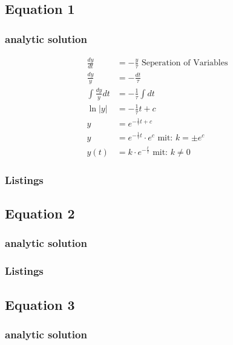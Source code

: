 \subsection{Equation 1}
\subsubsection{analytic solution}
\begin{align}
    \frac{dy}{dt}&=-\frac{y}{\tau} \text{  Seperation of Variables}\\
    \frac{dy}{y}&=-\frac{dt}{\tau} \\
    \int\frac{dy}{y} dt&=-\frac{1}{\tau} \int dt \\
    \ln{|y|}&=-\frac{1}{\tau}t+c \\
    y&=e^{-\frac{1}{\tau}t+c} \\
    y&=e^{-\frac{1}{\tau}t}\cdot e^{c} \text{ mit: } k=\pm e^c\\
    y(t)&=k\cdot e^{-\frac{t}{\tau}}\text{ mit: } k\neq0
\end{align}

\subsubsection{Listings}


\subsection{Equation 2}
\subsubsection{analytic solution}

\subsubsection{Listings}


\subsection{Equation 3}
\subsubsection{analytic solution}

